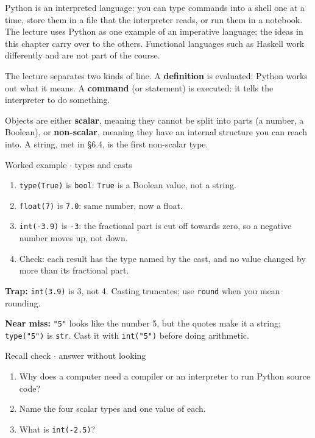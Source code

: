 \documentclass[11pt]{article}
\begin{document}
\begin{keepsection}
Python is an interpreted language: you can type commands into a shell one at a time, store them in a file that the interpreter reads, or run them in a notebook. The lecture uses Python as one example of an imperative language; the ideas in this chapter carry over to the others. Functional languages such as Haskell work differently and are not part of the course.

The lecture separates two kinds of line. A \textbf{definition} is evaluated: Python works out what it means. A \textbf{command} (or statement) is executed: it tells the interpreter to do something.

Objects are either \textbf{scalar}, meaning they cannot be split into parts (a number, a Boolean), or \textbf{non-scalar}, meaning they have an internal structure you can reach into. A string, met in §6.4, is the first non-scalar type.

\begin{workedbox}{Worked example \ensuremath{\cdot} types and casts}
\begin{enumerate}
\item \texttt{type(True)} is \texttt{bool}: \texttt{True} is a Boolean value, not a string.
\item \texttt{float(7)} is \texttt{7.0}: same number, now a float.
\item \texttt{int(-3.9)} is \texttt{-3}: the fractional part is cut off towards zero, so a negative number moves up, not down.
\item Check: each result has the type named by the cast, and no value changed by more than its fractional part.
\end{enumerate}
\end{workedbox}

\begin{notebox}\textbf{Trap:} \texttt{int(3.9)} is 3, not 4. Casting truncates; use \texttt{round} when you mean rounding.\end{notebox}

\begin{notebox}\textbf{Near miss:} \texttt{"5"} looks like the number 5, but the quotes make it a string; \texttt{type("5")} is \texttt{str}. Cast it with \texttt{int("5")} before doing arithmetic.\end{notebox}

\begin{recallbox}{Recall check \ensuremath{\cdot} answer without looking}
\begin{enumerate}
\item Why does a computer need a compiler or an interpreter to run Python source code?
\item Name the four scalar types and one value of each.
\item What is \texttt{int(-2.5)}?
\end{enumerate}


\end{recallbox}
\end{keepsection}
\end{document}

